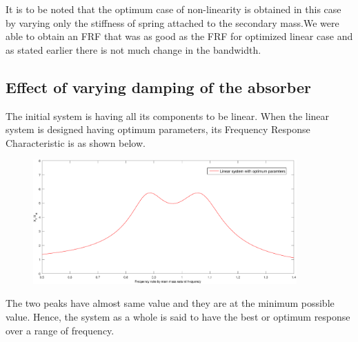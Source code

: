 It is to be noted that  the optimum case of non-linearity is obtained in this case by varying only the stiffness of spring attached to the secondary mass.We were able to obtain an FRF that was as good as the FRF for optimized linear case and as stated earlier there is not much change in the bandwidth.

\subsection{Effect of varying damping of the absorber}
The initial system is having all its components to be linear. When the linear system is designed having optimum parameters, its Frequency Response Characteristic is as shown below.\\[0.2in]
\begin{figure}[h!]
\includegraphics[width=0.9\textwidth]{"figures/linear"}\\[0.1in]
\end{figure}
The two peaks have almost same value and they are at the minimum possible value. Hence, the system as a whole is said to have the best or optimum response over a range of frequency.

